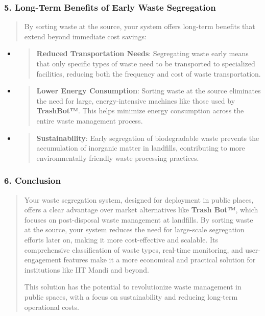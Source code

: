 \documentclass[
]{article}
\begin{document}
\hypertarget{section-1}{%
\subsubsection{}\label{section-1}}

\hypertarget{long-term-benefits-of-early-waste-segregation}{%
\subsubsection{5. Long-Term Benefits of Early Waste
Segregation}\label{long-term-benefits-of-early-waste-segregation}}

\begin{quote}
By sorting waste at the source, your system offers long-term benefits
that extend beyond immediate cost savings:
\end{quote}

\begin{itemize}
\item
  \begin{quote}
  \textbf{Reduced Transportation Needs}: Segregating waste early means
  that only specific types of waste need to be transported to
  specialized facilities, reducing both the frequency and cost of waste
  transportation.
  \end{quote}
\item
  \begin{quote}
  \textbf{Lower Energy Consumption}: Sorting waste at the source
  eliminates the need for large, energy-intensive machines like those
  used by \textbf{TrashBot™}. This helps minimize energy consumption
  across the entire waste management process.
  \end{quote}
\item
  \begin{quote}
  \textbf{Sustainability}: Early segregation of biodegradable waste
  prevents the accumulation of inorganic matter in landfills,
  contributing to more environmentally friendly waste processing
  practices.
  \end{quote}
\end{itemize}

\hypertarget{conclusion-1}{%
\subsubsection{6. Conclusion}\label{conclusion-1}}

\begin{quote}
Your waste segregation system, designed for deployment in public places,
offers a clear advantage over market alternatives like \textbf{Trash
Bot™}, which focuses on post-disposal waste management at landfills. By
sorting waste at the source, your system reduces the need for
large-scale segregation efforts later on, making it more cost-effective
and scalable. Its comprehensive classification of waste types, real-time
monitoring, and user-engagement features make it a more economical and
practical solution for institutions like IIT Mandi and beyond.

This solution has the potential to revolutionize waste management in
public spaces, with a focus on sustainability and reducing long-term
operational costs.
\end{quote}
\end{document}
